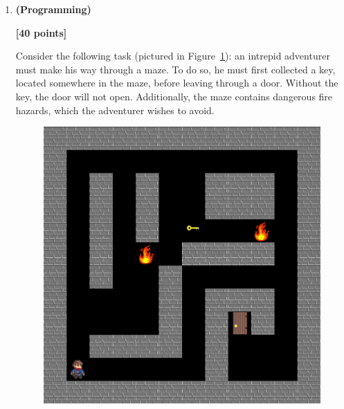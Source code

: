 \documentclass{article}
\newcounter{totalpoints}
\newcommand{\points}[1]{{\addtocounter{totalpoints}{#1}\textbf{[#1 points]}}}
\begin{document}
\begin{enumerate}
Now suppose that starting from state $S_t=W$, the current behaviour policy selects action $A_{t}=a$, leading to reward $R_{t+1}=4$ and a transition to state $S_{t+1}=X$.  The behaviour policy then selects action $A_{t+1}=a$.

\begin{enumerate}
    \item \points{6}
    What is the updated estimate for $Q(W,a)$ according to the $Q$-learning algorithm?
    Assume a step size of $\alpha=0.5$ and a discount rate of $\gamma=1$.
    \begin{answer}{1.5in}
    \end{answer}

    \item \points{6}
    What is the updated estimate for $Q(W,a)$ according to the Sarsa algorithm?
    Assume a step size of $\alpha=0.5$ and a discount rate of $\gamma=1$.
    \begin{answer}{1.5in}
    \end{answer}

\end{enumerate}


\newpage
\item \textbf{(Programming)} \points{40}
Consider the following task (pictured in Figure~\ref{fig:q6}): an intrepid adventurer must make his way through a maze. To do so, he must first collected a key, located somewhere in the maze, before leaving through a door. Without the key, the door will not open. Additionally, the maze contains dangerous fire hazards, which the adventurer wishes to avoid.  

 \begin{figure}
    \centering
    \includegraphics[width=0.5\columnwidth]{q6.png}
    \caption{}
    \label{fig:q6}
\end{figure}


\end{enumerate}
\end{document}
